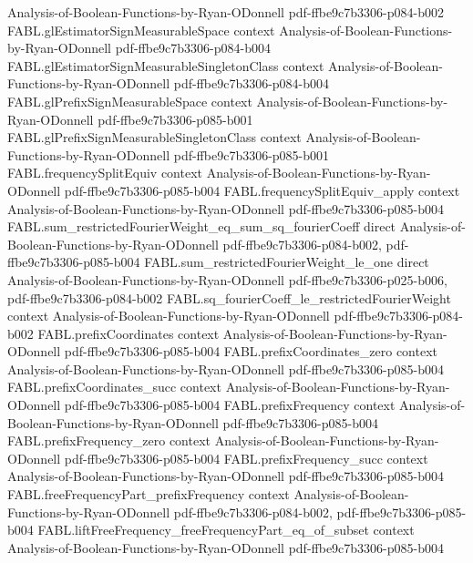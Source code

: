 \begin{theorem}
  {Analysis-of-Boolean-Functions-by-Ryan-ODonnell}
  {pdf-ffbe9c7b3306-p084-b002}
\proofstep
  {FABL.glEstimatorSignMeasurableSpace}
  {context}
  {Analysis-of-Boolean-Functions-by-Ryan-ODonnell}
  {pdf-ffbe9c7b3306-p084-b004}
\proofstep
  {FABL.glEstimatorSignMeasurableSingletonClass}
  {context}
  {Analysis-of-Boolean-Functions-by-Ryan-ODonnell}
  {pdf-ffbe9c7b3306-p084-b004}
\proofstep
  {FABL.glPrefixSignMeasurableSpace}
  {context}
  {Analysis-of-Boolean-Functions-by-Ryan-ODonnell}
  {pdf-ffbe9c7b3306-p085-b001}
\proofstep
  {FABL.glPrefixSignMeasurableSingletonClass}
  {context}
  {Analysis-of-Boolean-Functions-by-Ryan-ODonnell}
  {pdf-ffbe9c7b3306-p085-b001}
\proofstep
  {FABL.frequencySplitEquiv}
  {context}
  {Analysis-of-Boolean-Functions-by-Ryan-ODonnell}
  {pdf-ffbe9c7b3306-p085-b004}
\proofstep
  {FABL.frequencySplitEquiv_apply}
  {context}
  {Analysis-of-Boolean-Functions-by-Ryan-ODonnell}
  {pdf-ffbe9c7b3306-p085-b004}
\proofstep
  {FABL.sum_restrictedFourierWeight_eq_sum_sq_fourierCoeff}
  {direct}
  {Analysis-of-Boolean-Functions-by-Ryan-ODonnell}
  {pdf-ffbe9c7b3306-p084-b002,
    pdf-ffbe9c7b3306-p085-b004}
\proofstep
  {FABL.sum_restrictedFourierWeight_le_one}
  {direct}
  {Analysis-of-Boolean-Functions-by-Ryan-ODonnell}
  {pdf-ffbe9c7b3306-p025-b006,
    pdf-ffbe9c7b3306-p084-b002}
\proofstep
  {FABL.sq_fourierCoeff_le_restrictedFourierWeight}
  {context}
  {Analysis-of-Boolean-Functions-by-Ryan-ODonnell}
  {pdf-ffbe9c7b3306-p084-b002}
\proofstep
  {FABL.prefixCoordinates}
  {context}
  {Analysis-of-Boolean-Functions-by-Ryan-ODonnell}
  {pdf-ffbe9c7b3306-p085-b004}
\proofstep
  {FABL.prefixCoordinates_zero}
  {context}
  {Analysis-of-Boolean-Functions-by-Ryan-ODonnell}
  {pdf-ffbe9c7b3306-p085-b004}
\proofstep
  {FABL.prefixCoordinates_succ}
  {context}
  {Analysis-of-Boolean-Functions-by-Ryan-ODonnell}
  {pdf-ffbe9c7b3306-p085-b004}
\proofstep
  {FABL.prefixFrequency}
  {context}
  {Analysis-of-Boolean-Functions-by-Ryan-ODonnell}
  {pdf-ffbe9c7b3306-p085-b004}
\proofstep
  {FABL.prefixFrequency_zero}
  {context}
  {Analysis-of-Boolean-Functions-by-Ryan-ODonnell}
  {pdf-ffbe9c7b3306-p085-b004}
\proofstep
  {FABL.prefixFrequency_succ}
  {context}
  {Analysis-of-Boolean-Functions-by-Ryan-ODonnell}
  {pdf-ffbe9c7b3306-p085-b004}
\proofstep
  {FABL.freeFrequencyPart_prefixFrequency}
  {context}
  {Analysis-of-Boolean-Functions-by-Ryan-ODonnell}
  {pdf-ffbe9c7b3306-p084-b002,
    pdf-ffbe9c7b3306-p085-b004}
\proofstep
  {FABL.liftFreeFrequency_freeFrequencyPart_eq_of_subset}
  {context}
  {Analysis-of-Boolean-Functions-by-Ryan-ODonnell}
  {pdf-ffbe9c7b3306-p085-b004}

\end{theorem}
